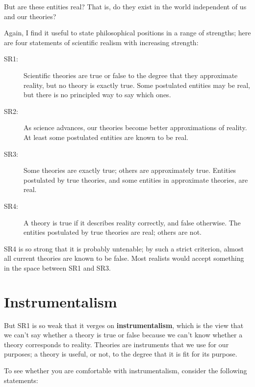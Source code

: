 \documentclass[12pt]{book}
\theoremstyle{exercise}
\begin{document}
But are these entities real?  That is, do they exist in the world
independent of us and our theories?


Again, I find it useful to state philosophical positions in a range of
strengths; here are four statements of scientific realism with increasing
strength:

\begin{description}

\item[SR1:] Scientific theories are true or false to the degree that
  they approximate reality, but no theory is exactly true.  Some
  postulated entities may be real, but there is no principled way to
  say which ones.

\item[SR2:] As science advances, our theories become better
  approximations of reality.  At least some postulated entities are
  known to be real.

\item[SR3:] Some theories are exactly true; others are approximately
  true.  Entities postulated by true theories, and some entities
  in approximate theories, are real.

\item[SR4:] A theory is true if it describes reality correctly, and
  false otherwise.  The entities postulated by true theories are real;
  others are not.

\end{description}

SR4 is so strong that it is probably untenable; by such a strict
criterion, almost all current theories are known to be false.
Most realists would accept something in the space
between SR1 and SR3.


\section{Instrumentalism}

But SR1 is so weak that it verges on {\bf instrumentalism}, which is
the view that we can't say whether a theory is true or false because
we can't know whether a theory corresponds to reality.  Theories are
instruments that we use for our purposes; a theory is useful, or not,
to the degree that it is fit for its purpose.


To see whether you are comfortable with instrumentalism, consider
the following statements:
\end{document}
